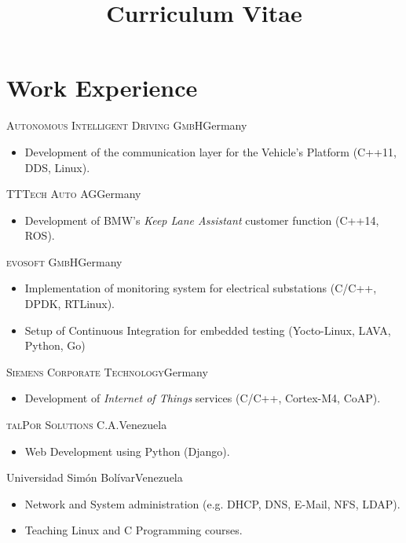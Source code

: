 \documentclass[10pt]{moderncv}
\title{Curriculum Vitae}
\begin{document}
\maketitle

\section{Work Experience}


{\textsc{Autonomous Intelligent Driving GmbH}}{Germany}{}{%
\begin{itemize}
  \item Development of the communication layer for the Vehicle's Platform
    (C++11, DDS, Linux).
\end{itemize}
}

{\textsc{TTTech Auto AG}}{Germany}{}{%
\begin{itemize}
  \item Development of BMW's \textit{Keep Lane Assistant}
    customer function (C++14, ROS).
\end{itemize}
}

{\textsc{evosoft GmbH}}{Germany}{}{%
\begin{itemize}
  \item Implementation of monitoring system for electrical substations
    (C/C++, DPDK, RTLinux).
  \item Setup of Continuous Integration for embedded testing (Yocto-Linux,
    LAVA, Python, Go)
\end{itemize}
}

{\textsc{Siemens Corporate Technology}}{Germany}{}{%
\begin{itemize}
  \item Development of \textit{Internet of Things} services (C/C++, Cortex-M4, CoAP).
\end{itemize}
}

{\textsc{talPor Solutions C.A.}}{Venezuela}{}{%
\begin{itemize}
  \item Web Development using Python (Django).
\end{itemize}
}

 {Universidad Sim\'{o}n Bol\'{i}var}{Venezuela}{}{%
\begin{itemize}
  \item Network and System administration (e.g. DHCP, DNS, E-Mail, NFS, LDAP).
  \item Teaching Linux and C Programming courses.
\end{itemize}
}
\end{document}
